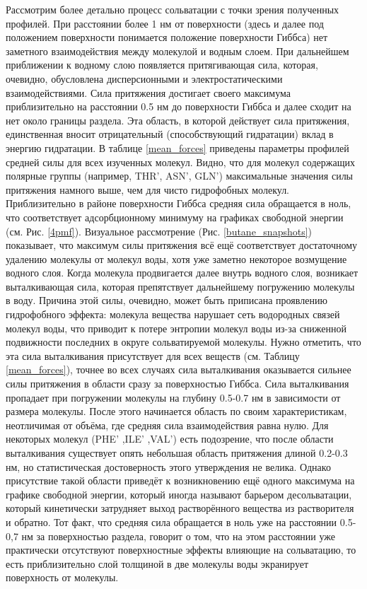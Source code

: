 Рассмотрим более детально процесс сольватации с точки зрения полученных профилей.
При расстоянии более 1 нм от поверхности (здесь и далее под положением поверхности понимается положение поверхности Гиббса) нет заметного взаимодействия между молекулой и водным слоем. При дальнейшем приближении к водному слою появляется притягивающая сила, которая, очевидно, обусловлена дисперсионными и электростатическими взаимодействиями. Сила притяжения достигает своего максимума приблизительно на расстоянии 0.5 нм до поверхности Гиббса и далее сходит на нет около границы раздела. Эта область, в которой действует сила притяжения, единственная вносит отрицательный (способствующий гидратации) вклад в энергию гидратации. В таблице \ref{mean_forces} приведены параметры профилей средней силы для всех изученных молекул. Видно, что для молекул содержащих полярные группы (например, THR', ASN', GLN') максимальные значения силы притяжения намного выше, чем для чисто гидрофобных молекул. Приблизительно в районе поверхности Гиббса средняя сила обращается в ноль, что соответствует адсорбционному минимуму на графиках свободной энергии (см. Рис. \ref{4pmf}). Визуальное рассмотрение (Рис. \ref{butane_snapshots}) показывает, что максимум силы притяжения всё ещё соответствует достаточному удалению молекулы от молекул воды, хотя уже заметно некоторое возмущение водного слоя. Когда молекула продвигается далее внутрь водного слоя, возникает выталкивающая сила, которая препятствует дальнейшему погружению молекулы в воду. Причина этой силы, очевидно, может быть приписана проявлению гидрофобного эффекта: молекула вещества нарушает сеть водородных связей молекул воды, что приводит к потере энтропии молекул воды из-за сниженной подвижности последних в округе сольватируемой молекулы. Нужно отметить, что эта сила выталкивания присутствует для  всех веществ (см. Таблицу \ref{mean_forces}), точнее во всех случаях сила выталкивания оказывается сильнее силы притяжения в области сразу за поверхностью Гиббса.
Сила выталкивания пропадает при погружении молекулы на глубину 0.5-0.7 нм в зависимости от размера молекулы. После этого начинается область по своим характеристикам, неотличимая от объёма, где средняя сила взаимодействия равна нулю.
Для некоторых молекул (PHE' ,ILE' ,VAL') есть подозрение, что после области выталкивания существует опять небольшая область притяжения длиной 0.2-0.3 нм, но статистическая достоверность этого утверждения не велика.  Однако присутствие такой области приведёт к возникновению ещё одного максимума на графике свободной энергии, который иногда называют барьером десольватации, который кинетически затрудняет выход растворённого вещества из растворителя и обратно. Тот факт, что средняя сила обращается в ноль уже на расстоянии 0.5-0,7 нм за поверхностью раздела, говорит о том, что на этом расстоянии уже практически отсутствуют поверхностные эффекты влияющие на сольватацию, то есть приблизительно слой толщиной в две молекулы воды экранирует поверхность от молекулы.


